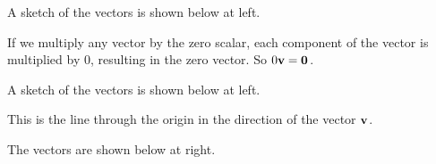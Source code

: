 \begin{activitySolution}
	\ba
	\item A sketch of the vectors is shown below at left. 
    \item If we multiply any vector by the zero scalar, each component of the vector is multiplied by 0, resulting in the zero vector. So $0\mathbf{v} = \mathbf{0}$.
    \item A sketch of the vectors is shown below at left. 
    \item This is the line through the origin in the direction of the vector $\mathbf{v}$. 
     \item The vectors are shown below at right. 
\begin{center}
         \ \ 

\end{center}
\end{activitySolution}

